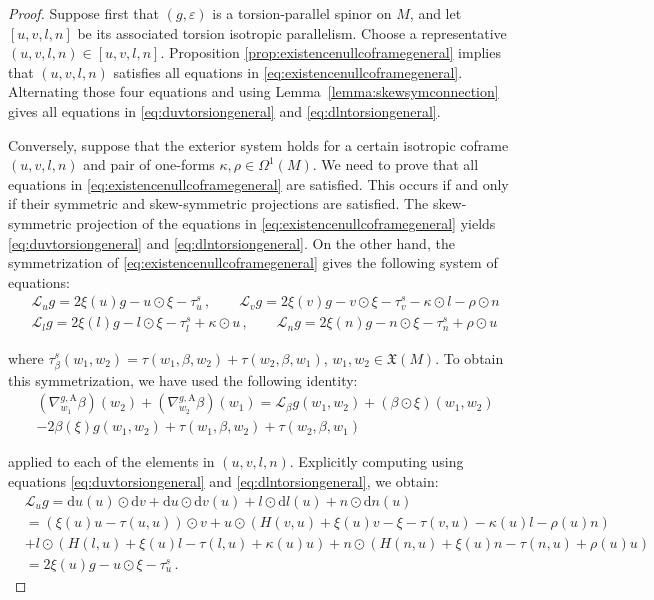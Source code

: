 \documentclass[10pt,reqno,a4paper]{amsart}
\theoremstyle{plain}
\theoremstyle{definition}
\theoremstyle{remark}
\theoremstyle{remark}
\def\mA{\mathrm{A}}
\def\dd{\mathrm{d}}
\def\cL{\mathcal{L}}
\def\cL{\mathcal{L}}
\renewcommand{\(}{ (}
\renewcommand{\)}{ )}
\begin{document}
\begin{proof}
Suppose first that $(g,\varepsilon)$ is a torsion-parallel spinor on $M$, and let $[u,v,l,n]$ be its associated torsion isotropic parallelism.  Choose a representative $(u,v,l,n) \in [u,v,l,n]$. Proposition \ref{prop:existencenullcoframegeneral} implies that $(u,v,l,n)$ satisfies all equations in \eqref{eq:existencenullcoframegeneral}. Alternating those four equations and using Lemma~\ref{lemma:skewsymconnection} gives all equations in \eqref{eq:duvtorsiongeneral} and \eqref{eq:dlntorsiongeneral}. \medskip

Conversely, suppose that the exterior system holds for a certain isotropic coframe $(u,v,l,n)$ and pair of one-forms $\kappa,\rho \in \Omega^1(M)$. We need to prove that all equations in \eqref{eq:existencenullcoframegeneral} are satisfied. This occurs if and only if their symmetric and skew-symmetric projections are satisfied. The skew-symmetric projection of the equations in \eqref{eq:existencenullcoframegeneral} yields \eqref{eq:duvtorsiongeneral} and \eqref{eq:dlntorsiongeneral}. On the other hand, the symmetrization of \eqref{eq:existencenullcoframegeneral} gives the following system of equations:
\begin{eqnarray*}
& \cL_{u} g = 2 \xi(u) g	- u\odot \xi  - \tau^s_u\, , \qquad \cL_v g = 2 \xi(v) g	- v\odot \xi - \tau^s_v - \kappa\odot l - \rho\odot n \\
& \cL_l g = 2 \xi(l) g	- l\odot \xi - \tau^s_l + \kappa\odot u\, , \qquad \cL_n g = 2 \xi(n) g	- n\odot \xi - \tau^s_n  + \rho\odot u 
\end{eqnarray*}

\noindent
where $\tau^s_{\beta}(w_1 , w_2) = \tau(w_1,\beta,w_2) + \tau(w_2,\beta,w_1)$, $w_1 , w_2 \in \mathfrak{X}(M)$. To obtain this symmetrization, we have used the following identity:
\begin{eqnarray*}
& (\nabla^{g,\mA}_{w_1} \beta) (w_2) + (\nabla^{g,\mA}_{w_2} \beta) (w_1) = \cL_{\beta} g (w_1,w_2) + (\beta \odot \xi)(w_1 , w_2) \\
& - 2 \beta(\xi) g(w_1,w_2)  + \tau (w_1,\beta,w_2) + \tau(w_2,\beta,w_1) 
\end{eqnarray*}

\noindent
applied to each of the elements in $(u,v,l,n)$. Explicitly computing using equations \eqref{eq:duvtorsiongeneral} and \eqref{eq:dlntorsiongeneral}, we obtain:
\begin{eqnarray*}
& \cL_{u} g = \dd u (u)\odot \dd v  + \dd u \odot \dd v(u) + l \odot \dd l (u) + n \odot \dd n (u)\\
& = (\xi(u) u - \tau(u,u)) \odot v + u\odot (H(v,u) + \xi(u) v - \xi -\tau(v,u) - \kappa(u) l - \rho(u) n) \\
& + l \odot (H(l,u) + \xi(u) l - \tau(l,u) + \kappa(u) u) + n \odot (H(n,u) + \xi(u) n - \tau(n,u) + \rho(u) u)\\
& =  2 \xi(u) g	- u\odot \xi  - \tau^s_u\, .
\end{eqnarray*}
	

\end{proof}
\end{document}
